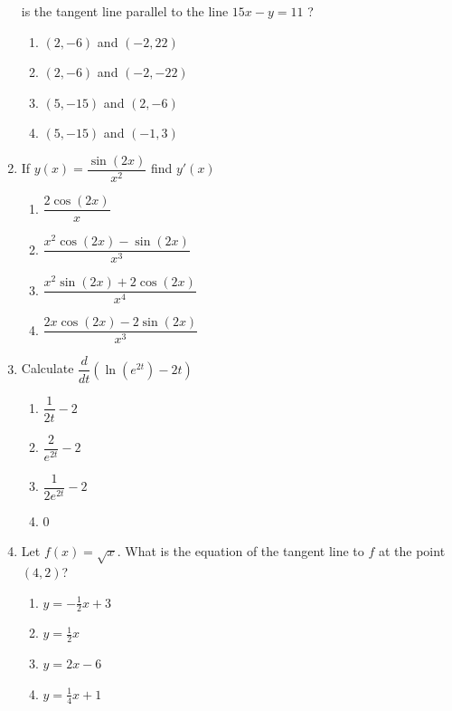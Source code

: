 \documentclass{article}
\begin{document}
\begin{enumerate}
\begin{minipage}[t]{\linewidth}
is the tangent line parallel to the line \(15 x-y=11\) ?\\[0.1em]
		\begin{enumerate}
		\itemsep4em
			\item  $(2,-6)$ and $(-2,22)$
			\item  $(2,-6)$ and $(-2,-22)$
			\item  $(5,-15)$ and $(2,-6)$
			\item  $(5,-15)$ and $(-1,3)$
		\end{enumerate}
	\end{minipage}
	\item
	\begin{minipage}[t]{\linewidth}
		If \(y(x) = \dfrac{\sin(2x)}{x^2}\) find \(y'(x)\)\\[0.1em]
		\begin{enumerate}
		\itemsep1em
			\item  $\dfrac{ 2 \cos(2x)}{x}$
			\item  $\dfrac{ x^2 \cos(2x) - \sin(2x)} { x^3}$
			\item  $\dfrac{ x^2 \sin(2x) + 2 \cos(2x)} {x^4}$
			\item  $\dfrac{2 x \cos(2 x) - 2 \sin(2 x)}{x^3}$
		\end{enumerate}
	\end{minipage}
	\item
	\begin{minipage}[t]{\linewidth}
		Calculate \(\dfrac{d}{dt} \left( \ln(e^{2t}) - 2t \right)\)\\[0.1em]
		\begin{enumerate}
		\itemsep1em
			\item  $\dfrac{1}{2t}-2$
			\item  $\dfrac{2}{e^{2t}}-2$
			\item  $\dfrac{1}{2e^{2t}}-2$
			\item  0
		\end{enumerate}
	\end{minipage}
	\item
	\begin{minipage}[t]{\linewidth}
		Let \(f(x)=\sqrt{x}\). What is the equation of the tangent line to \(f\)
at the point \((4,2)\)?\\[0.1em]
		\begin{enumerate}
		\itemsep1em
			\item  $y=-\frac{1}{2} x+3$
			\item  $y=\frac{1}{2} x$
			\item  $y=2 x-6$
			\item  $y=\frac{1}{4} x+1$

\end{enumerate}
\end{minipage}
\end{enumerate}
\end{document}
